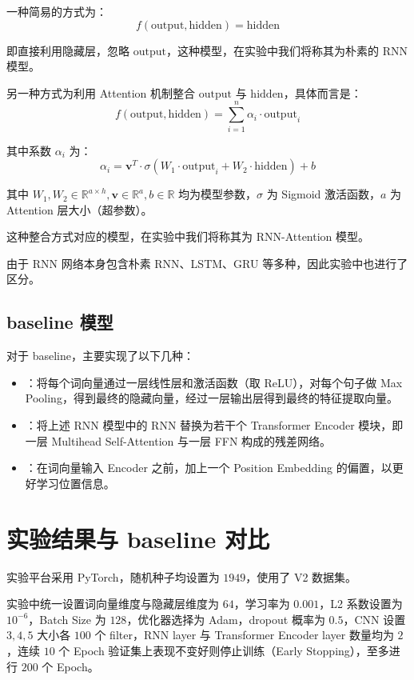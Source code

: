 \documentclass[a4paper]{article}
\begin{document}
    一种简易的方式为：
    $$
    f(\mathrm{output}, \mathrm{hidden}) = \mathrm{hidden}
    $$

    即直接利用隐藏层，忽略 $\mathrm{output}$，这种模型，在实验中我们将称其为朴素的 RNN 模型。

    另一种方式为利用 Attention 机制整合 $\mathrm{output}$ 与 $\mathrm{hidden}$，具体而言是：
    $$
    f(\mathrm{output}, \mathrm{hidden}) = \sum_{i = 1}^n \alpha_i \cdot \mathrm{output}_i
    $$

    其中系数 $\alpha_i$ 为：
    $$
    \alpha_i = \mathbf{v}^T \cdot \sigma(W_1 \cdot \mathrm{output}_i + W_2 \cdot \mathrm{hidden}) + b
    $$

    其中 $W_1, W_2 \in \mathbb{R}^{a \times h}, \mathbf{v} \in \mathbb{R}^a, b \in \mathbb{R}$ 均为模型参数，$\sigma$ 为 Sigmoid 激活函数，$a$ 为 Attention 层大小（超参数）。

    这种整合方式对应的模型，在实验中我们将称其为 RNN-Attention 模型。

    由于 RNN 网络本身包含朴素 RNN、LSTM、GRU 等多种，因此实验中也进行了区分。

    \subsection{baseline 模型}

    对于 baseline，主要实现了以下几种：

    \begin{itemize}
        \item {}：将每个词向量通过一层线性层和激活函数（取 ReLU），对每个句子做 Max Pooling，得到最终的隐藏向量，经过一层输出层得到最终的特征提取向量。
        \item {}：将上述 RNN 模型中的 RNN 替换为若干个 Transformer Encoder 模块，即一层 Multihead Self-Attention 与一层 FFN 构成的残差网络。
        \item {}：在词向量输入 Encoder 之前，加上一个 Position Embedding 的偏置，以更好学习位置信息。
    \end{itemize}
    
    \newpage
    \section{实验结果与 baseline 对比}
    
    实验平台采用 PyTorch，随机种子均设置为 $1949$，使用了 V2 数据集。

    实验中统一设置词向量维度与隐藏层维度为 $64$，学习率为 $0.001$，L2 系数设置为 $10^{-6}$，Batch Size 为 $128$，优化器选择为 Adam，dropout 概率为 $0.5$，CNN 设置 $3, 4, 5$ 大小各 $100$ 个 filter，RNN layer 与 Transformer Encoder layer 数量均为 $2$，连续 $10$ 个 Epoch 验证集上表现不变好则停止训练（Early Stopping），至多进行 $200$ 个 Epoch。
    
\end{document}
